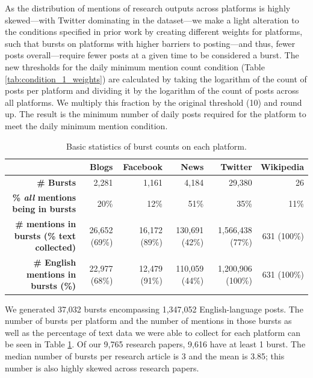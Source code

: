 \documentclass[letterpaper]{article} %
\begin{document}
As the distribution of mentions of research outputs across platforms is highly skewed---with Twitter dominating in the dataset---we make a light alteration to the conditions specified in prior work \citep{chengCascadesRecur2016} by creating different weights for platforms, such that bursts on platforms with higher barriers to posting---and thus, fewer posts overall---require fewer posts at a given time to be considered a burst. %
The new thresholds for the daily minimum mention count condition (Table \ref{tab:condition_1_weights}) are calculated by taking the logarithm of the count of posts per platform and dividing it by the logarithm of the count of posts across all platforms. We multiply this fraction by the original threshold (10) and round up. The result is the minimum number of daily posts required for the platform to meet the daily minimum mention condition.


\begin{table}[t]
    \centering
    \begin{tabular}{@{}r|r r r r r @{}}
    & \textbf{Blogs} & \textbf{Facebook} & \textbf{News} & \textbf{Twitter} & \textbf{Wikipedia} \\
    \hline
    \textbf{\# Bursts} & 2,281 & 1,161 & 4,184 & 29,380 & 26 \\
    \textbf{\% \textit{all} mentions being in bursts} & 20\% & 12\% & 51\% & 35\% & 11\% \\
    \textbf{\# mentions in bursts (\% text collected)} & 26,652 (69\%) & 16,172 (89\%) & 130,691 (42\%) & 1,566,438 (77\%) & 631 (100\%) \\
    \textbf{\# English mentions in bursts (\%)} & 22,977 (68\%) & 12,479 (91\%) & 110,059 (44\%) & 1,200,906 (100\%) & 631 (100\%)\\
    \end{tabular}
    \caption{Basic statistics of burst counts on each platform.}
    \label{tab:burst_post_counts}
\end{table}


We generated 37,032 bursts encompassing 1,347,052 English-language posts. The number of bursts per platform and the number of mentions in those bursts as well as the percentage of text data we were able to collect for each platform can be seen in Table \ref{tab:burst_post_counts}.
Of our 9,765 research papers, 9,616 have at least 1 burst. The median number of bursts per research article is 3 and the mean is 3.85; this number is also highly skewed across research papers.%
\end{document}
